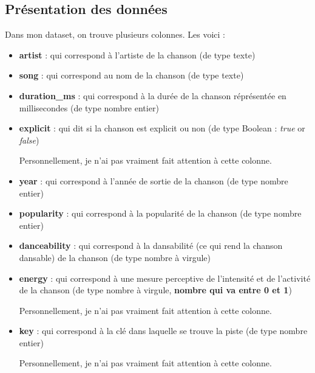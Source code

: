 \documentclass[french]{article}
\newcommand{\newLine}{\vspace{0.2cm}}
\begin{document}
\subsection{Présentation des données}
Dans mon dataset, on trouve plusieurs colonnes. Les voici :
\begin{itemize}
	\item \textbf{artist} : qui correspond à l'artiste de la chanson (de type texte)

	\item \textbf{song} : qui correspond au nom de la chanson (de type texte)

	\item \textbf{duration\_ms} : qui correspond à la durée de la chanson réprésentée en millisecondes (de type nombre entier)

	\item \textbf{explicit} : qui dit si la chanson est explicit ou non (de type Boolean : \textit{true} or \textit{false})

	      Personnellement, je n'ai pas vraiment fait attention à cette colonne. \newLine

	\item \textbf{year} : qui correspond à l'année de sortie de la chanson (de type nombre entier)

	\item \textbf{popularity} : qui correspond à la popularité de la chanson (de type nombre entier)

	\item \textbf{danceability} : qui correspond à la dansabilité (ce qui rend la chanson dansable) de la chanson (de type nombre à virgule)

	\item \textbf{energy} : qui correspond à une mesure perceptive de l'intensité et de l'activité de la chanson (de type nombre à virgule, \textbf{nombre qui va entre 0 et 1})

	Personnellement, je n'ai pas vraiment fait attention à cette colonne. \newLine

	\item \textbf{key} : qui correspond à la clé dans laquelle se trouve la piste (de type nombre entier)

	Personnellement, je n'ai pas vraiment fait attention à cette colonne. \newLine


\end{itemize}
\end{document}
